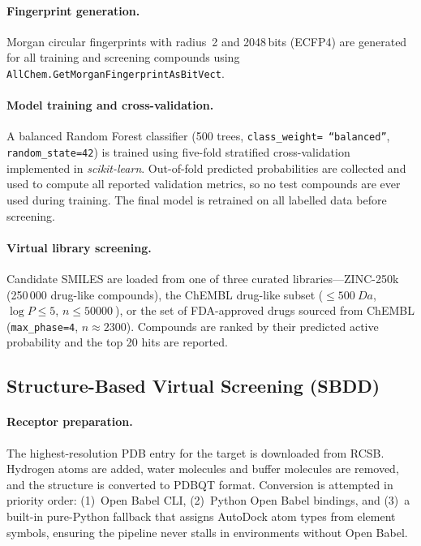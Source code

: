 \documentclass[journal=jcisd8,manuscript=article]{achemso}
\begin{document}
\paragraph{Fingerprint generation.}
Morgan circular fingerprints with radius~2 and 2048\,bits (ECFP4) are
generated for all training and screening compounds using
\texttt{AllChem.GetMorganFingerprintAsBitVect}.\cite{rogers2010extended}

\paragraph{Model training and cross-validation.}
A balanced Random Forest classifier (500 trees, \texttt{class\_weight=
``balanced''}, \texttt{random\_state=42}) is trained using five-fold
stratified cross-validation implemented in
\textit{scikit-learn}.\cite{pedregosa2011scikit}
Out-of-fold predicted probabilities are collected and used to compute all
reported validation metrics, so no test compounds are ever used during
training.  The final model is retrained on all labelled data before
screening.

\paragraph{Virtual library screening.}
Candidate SMILES are loaded from one of three curated
libraries---ZINC-250k (250\,000 drug-like compounds),\cite{irwin2012zinc}
the ChEMBL drug-like subset ($\leq \SI{500}{Da}$, $\log P \leq 5$,
$n \leq \SI{50000}{}$), or the set of FDA-approved drugs sourced from
ChEMBL (\texttt{max\_phase=4}, $n \approx 2300$).  Compounds are ranked
by their predicted active probability and the top 20 hits are reported.

\subsection{Structure-Based Virtual Screening (SBDD)}

\paragraph{Receptor preparation.}
The highest-resolution PDB entry for the target is downloaded from RCSB.
Hydrogen atoms are added, water molecules and buffer molecules are removed,
and the structure is converted to PDBQT format.  Conversion is attempted in
priority order: (1)~Open Babel CLI, (2)~Python Open Babel bindings, and
(3)~a built-in pure-Python fallback that assigns AutoDock atom types from
element symbols, ensuring the pipeline never stalls in environments without
Open Babel.
\end{document}
